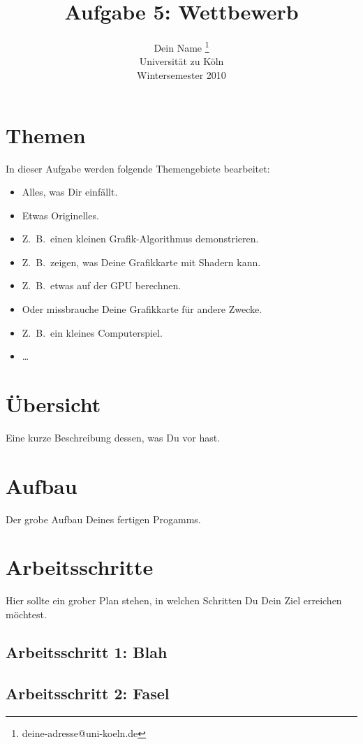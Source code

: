 \documentclass[10pt]{article}
\title{Aufgabe 5: Wettbewerb}
\author{Dein Name \thanks{deine-adresse@uni-koeln.de}\\
        \scriptsize Universität zu Köln\\
        Wintersemester 2010
}
\begin{document}
\maketitle

\begin{multicols}{2}

\section{Themen}
In dieser Aufgabe werden folgende Themengebiete bearbeitet:
\begin{itemize}
\item Alles, was Dir einfällt.
\item Etwas Originelles.
\item Z.~B.\ einen kleinen Grafik-Algorithmus demonstrieren.
\item Z.~B.\ zeigen, was Deine Grafikkarte mit Shadern kann.
\item Z.~B.\ etwas auf der GPU berechnen.
\item Oder missbrauche Deine Grafikkarte für andere Zwecke.
\item Z.~B.\ ein kleines Computerspiel.
\item \dots
\end{itemize}


\section{Übersicht}

Eine kurze Beschreibung dessen, was Du vor hast.

\section{Aufbau}

Der grobe Aufbau Deines fertigen Progamms.

\section{Arbeitsschritte}
Hier sollte ein grober Plan stehen, in welchen Schritten Du Dein Ziel
erreichen möchtest.
\subsection{Arbeitsschritt 1: Blah}
\subsection{Arbeitsschritt 2: Fasel}


\end{multicols}
\end{document}
